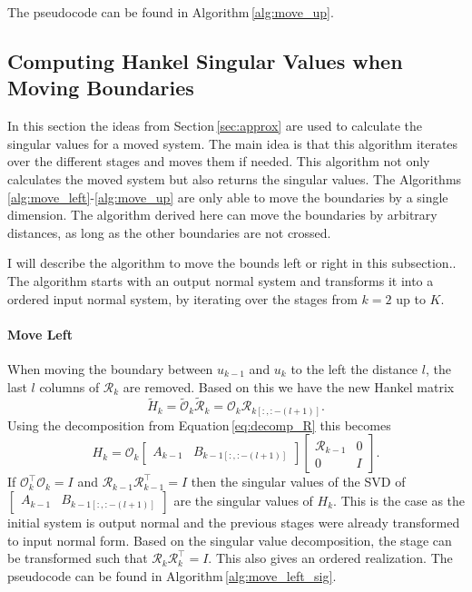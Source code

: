 \documentclass[doctype=mastersthesis,BCOR=15mm,biblatex]{ldvbook}%
\newcommand{\R}{\mathcal{R}} %
\newcommand{\Ob}{\mathcal{O}} %
\newcommand{\eye}{I} %
\begin{document}
The pseudocode can be found in Algorithm\,\ref{alg:move_up}.

\FloatBarrier
\subsection{Computing Hankel Singular Values when Moving Boundaries}\label{subsec:move_sig}
In this section the ideas from Section\,\ref{sec:approx} are used to calculate the singular values for a moved system.
The main idea is that this algorithm iterates over the different stages and moves them if needed.
This algorithm not only calculates the moved system but also returns the singular values.
The Algorithms\,\ref{alg:move_left}-\ref{alg:move_up} are only able to move the boundaries by a single dimension.
The algorithm derived here can move the boundaries by arbitrary distances, as long as the other boundaries are not crossed. 


I will describe the algorithm to move the bounds left or right in this subsection.. 
The algorithm starts with an output normal system and transforms it into a ordered input normal system, by iterating over the stages from $k=2$ up to $K$.


\paragraph{Move Left}
When moving the boundary between $u_{k-1}$ and $u_{k}$ to the left the distance $l$, the last $l$ columns of $\R_{k}$ are removed.
Based on this we have the new Hankel matrix
\begin{equation}
	\tilde{H}_k = \tilde{\Ob}_k \tilde{\R}_k = \Ob_{k}\R_{k[:,:-(l+1)]}
	.
\end{equation}
Using the decomposition from Equation\,\ref{eq:decomp_R} this becomes
\begin{equation}
	H_{k}=\Ob_{k}
	\begin{bmatrix}
	A_{k-1}&B_{k-1[:,:-(l+1)]}
	\end{bmatrix}
	\begin{bmatrix}
	\R_{k-1} & 0\\ 0& \eye
	\end{bmatrix}
	.
\end{equation}
If $\Ob_k^\top \Ob_k = \eye$ and $\R_{k-1} \R_{k-1}^\top = \eye$ then the singular values of the SVD of $\begin{bmatrix}
A_{k-1}&B_{k-1[:,:-(l+1)]}
\end{bmatrix}$ are the singular values of $H_k$.
This is the case as the initial system is output normal and the previous stages were already transformed to input normal form.
Based on the singular value decomposition, the stage can be transformed such that $\R_{k} \R_{k}^\top = \eye$.
This also gives an ordered realization.
The pseudocode can be found in Algorithm\,\ref{alg:move_left_sig}.
\end{document}
